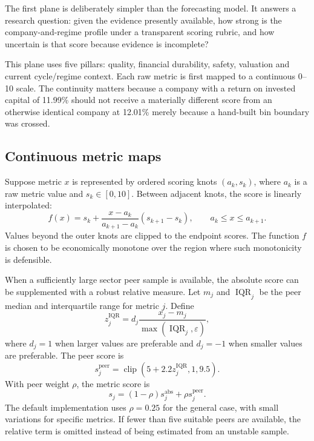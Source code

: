 \documentclass[11pt]{article}
\newcommand{\clip}{\operatorname{clip}}
\begin{document}
The first plane is deliberately simpler than the forecasting model. It answers a research question: given the evidence presently available, how strong is the company-and-regime profile under a transparent scoring rubric, and how uncertain is that score because evidence is incomplete?

This plane uses five pillars: quality, financial durability, safety, valuation and current cycle/regime context. Each raw metric is first mapped to a continuous 0--10 scale. The continuity matters because a company with a return on invested capital of 11.99\% should not receive a materially different score from an otherwise identical company at 12.01\% merely because a hand-built bin boundary was crossed.

\subsection{Continuous metric maps}

Suppose metric $x$ is represented by ordered scoring knots $(a_k,s_k)$, where $a_k$ is a raw metric value and $s_k\in[0,10]$. Between adjacent knots, the score is linearly interpolated:
\begin{equation}
f(x)=s_k+\frac{x-a_k}{a_{k+1}-a_k}(s_{k+1}-s_k),
\qquad a_k\le x\le a_{k+1}.
\label{eq:interp}
\end{equation}
Values beyond the outer knots are clipped to the endpoint scores. The function $f$ is chosen to be economically monotone over the region where such monotonicity is defensible.

When a sufficiently large sector peer sample is available, the absolute score can be supplemented with a robust relative measure. Let $m_j$ and $\operatorname{IQR}_j$ be the peer median and interquartile range for metric $j$. Define
\begin{equation}
z_j^{\mathrm{IQR}}=d_j\frac{x_j-m_j}{\max(\operatorname{IQR}_j,\varepsilon)},
\end{equation}
where $d_j=1$ when larger values are preferable and $d_j=-1$ when smaller values are preferable. The peer score is
\begin{equation}
s_j^{\mathrm{peer}}=\clip\left(5+2.2z_j^{\mathrm{IQR}},1,9.5\right).
\end{equation}
With peer weight $\rho$, the metric score is
\begin{equation}
s_j=(1-\rho)s_j^{\mathrm{abs}}+\rho s_j^{\mathrm{peer}}.
\label{eq:peerblend}
\end{equation}
The default implementation uses $\rho=0.25$ for the general case, with small variations for specific metrics. If fewer than five suitable peers are available, the relative term is omitted instead of being estimated from an unstable sample.
\end{document}
